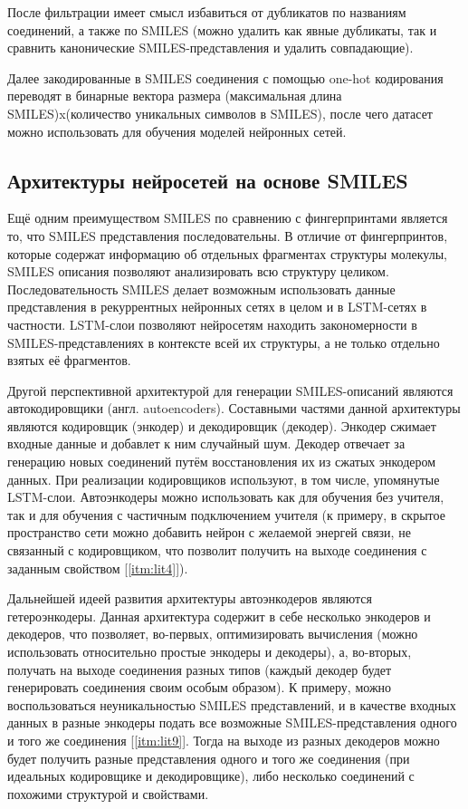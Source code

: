 \documentclass[a4paper,14pt]{extreport}
\begin{document}
    После фильтрации имеет смысл избавиться от дубликатов по названиям соединений, а также по SMILES (можно удалить как явные дубликаты, так и сравнить канонические SMILES-представления и удалить совпадающие).
    
   Далее закодированные в SMILES соединения с помощью one-hot кодирования переводят в бинарные вектора размера (максимальная длина SMILES)x(количество уникальных символов в SMILES), после чего датасет можно использовать для обучения моделей нейронных сетей.
  
  \subsection{Архитектуры нейросетей на основе SMILES}
  \label{ss:fp_other_subsec}
  Ещё одним преимуществом SMILES по сравнению с фингерпринтами является то, что SMILES представления последовательны. В отличие от фингерпринтов, которые содержат информацию об отдельных фрагментах структуры молекулы, SMILES описания позволяют анализировать всю структуру целиком. Последовательность SMILES делает возможным использовать данные представления в рекуррентных нейронных сетях в целом и в LSTM-сетях в частности. LSTM-слои позволяют нейросетям находить закономерности в SMILES-представлениях в контексте всей их структуры, а не только отдельно взятых её фрагментов.
  
  Другой перспективной архитектурой для генерации SMILES-описаний являются автокодировщики (англ. autoencoders). Составными частями данной архитектуры являются кодировщик (энкодер) и декодировщик (декодер). Энкодер сжимает входные данные и добавлет к ним случайный шум. Декодер отвечает за генерацию новых соединений путём восстановления их из сжатых энкодером данных. При реализации кодировщиков используют, в том числе, упомянутые LSTM-слои. Автоэнкодеры можно использовать как для обучения без учителя, так и для обучения с частичным подключением учителя (к примеру, в скрытое пространство сети можно добавить нейрон с желаемой энергей связи, не связанный с кодировщиком, что позволит получить на выходе соединения с заданным свойством [\ref{itm:lit4}]).
  
  Дальнейшей идеей развития архитектуры автоэнкодеров являются гетероэнкодеры. Данная архитектура содержит в себе несколько энкодеров и декодеров, что позволяет, во-первых, оптимизировать вычисления (можно использовать относительно простые энкодеры и декодеры), а, во-вторых, получать на выходе соединения разных типов (каждый декодер будет генерировать соединения своим особым образом). К примеру, можно воспользоваться неуникальностью SMILES представлений, и в качестве входных данных в разные энкодеры подать все возможные SMILES-представления одного и того же соединения [\ref{itm:lit9}]. Тогда на выходе из разных декодеров можно будет получить разные представления одного и того же соединения (при идеальных кодировщике и декодировщике), либо несколько соединений с похожими структурой и свойствами.
  
\end{document}
